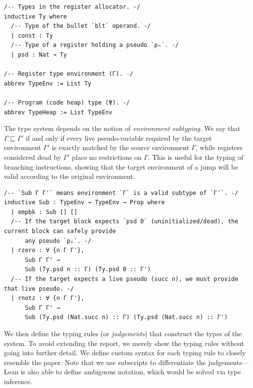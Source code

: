 \documentclass[]{NobArticle}
\begin{document}
\begin{minipage}{\linewidth}
\begin{lstlisting}
/-- Types in the register allocator. -/
inductive Ty where
  /-- Type of the bullet `blt` operand. -/
  | const : Ty
  /-- Type of a register holding a pseudo `pₙ`. -/
  | psd : Nat → Ty

/-- Register type environment (Γ). -/
abbrev TypeEnv := List Ty

/-- Program (code heap) type (Ψ). -/
abbrev TypeHeap := List TypeEnv
\end{lstlisting}
\end{minipage}

The type system depends on the notion of \textit{environment subtyping}. We say that $\Gamma \sqsubseteq \Gamma'$ if and only if every live pseudo-variable required by the target environment $\Gamma'$ is exactly matched by the source environment $\Gamma$, while registers considered dead by $\Gamma'$ place no restrictions on $\Gamma$. This is useful for the typing of branching instructions, showing that the target environment of a jump will be valid according to the original environment.

\begin{minipage}{\linewidth}
\begin{lstlisting}
/-- `Sub Γ Γ'` means environment `Γ` is a valid subtype of `Γ'`. -/
inductive Sub : TypeEnv → TypeEnv → Prop where
  | empbk : Sub [] []
  /-- If the target block expects `psd 0` (uninitialized/dead), the current block can safely provide
      any pseudo `pₙ`. -/
  | rzero : ∀ {n Γ Γ'},
      Sub Γ Γ' →
      Sub (Ty.psd n :: Γ) (Ty.psd 0 :: Γ')
  /-- If the target expects a live pseudo (succ n), we must provide that live pseudo. -/
  | rnotz : ∀ {n Γ Γ'},
      Sub Γ Γ' →
      Sub (Ty.psd (Nat.succ n) :: Γ) (Ty.psd (Nat.succ n) :: Γ')  
\end{lstlisting}
\end{minipage}

We then define the typing rules (or \textit{judgements}) that construct the types of the system. To avoid extending the report, we merely show the typing rules without going into further detail. We define custom syntax for each typing rule to closely resemble the paper. Note that we use subscripts to differentiate the judgements---Lean is also able to define ambiguous notation, which would be solved via type inference.
\end{document}
